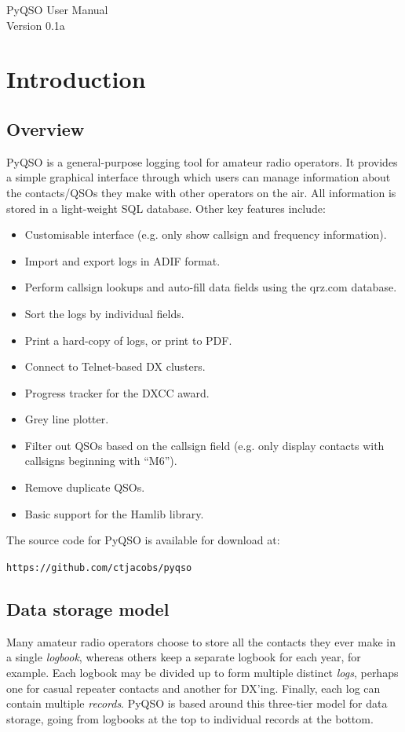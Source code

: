 \documentclass[11pt, a4paper]{report}
\begin{document}
\begin{titlepage}
\begin{center}
\vspace*{5cm}
\huge{PyQSO User Manual}\\\vspace*{5cm}
\LARGE{Version 0.1a}
\end{center}
\end{titlepage}

\tableofcontents

\chapter{Introduction}\label{chap:introduction}
\section{Overview}
PyQSO is a general-purpose logging tool for amateur radio operators. It provides a simple graphical interface through which users can manage information about the contacts/QSOs they make with other operators on the air. All information is stored in a light-weight SQL database. Other key features include:
\begin{itemize}
  \item Customisable interface (e.g. only show callsign and frequency information).
  \item Import and export logs in ADIF format.
  \item Perform callsign lookups and auto-fill data fields using the qrz.com database.
  \item Sort the logs by individual fields.
  \item Print a hard-copy of logs, or print to PDF.
  \item Connect to Telnet-based DX clusters.
  \item Progress tracker for the DXCC award.
  \item Grey line plotter.
  \item Filter out QSOs based on the callsign field (e.g. only display contacts with callsigns beginning with ``M6'').
  \item Remove duplicate QSOs.
  \item Basic support for the Hamlib library.
\end{itemize}
The source code for PyQSO is available for download at:

\texttt{https://github.com/ctjacobs/pyqso}

\section{Data storage model}
Many amateur radio operators choose to store all the contacts they ever make in a single \textit{logbook}, whereas others keep a separate logbook for each year, for example. Each logbook may be divided up to form multiple distinct \textit{logs}, perhaps one for casual repeater contacts and another for DX'ing. Finally, each log can contain multiple \textit{records}. PyQSO is based around this three-tier model for data storage, going from logbooks at the top to individual records at the bottom. 
\end{document}
